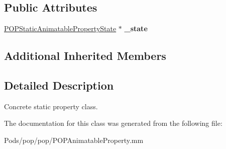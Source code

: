 \subsection*{Public Attributes}
\begin{DoxyCompactItemize}
\item 
\mbox{\label{interface_p_o_p_static_animatable_property_a6e920ae110f35be65164a6d5eef1ce87}} 
\mbox{\hyperlink{struct___p_o_p_static_animatable_property_state}{P\+O\+P\+Static\+Animatable\+Property\+State}} $\ast$ {\bfseries \+\_\+state}
\end{DoxyCompactItemize}
\subsection*{Additional Inherited Members}


\subsection{Detailed Description}
Concrete static property class. 

The documentation for this class was generated from the following file\+:\begin{DoxyCompactItemize}
\item 
Pods/pop/pop/P\+O\+P\+Animatable\+Property.\+mm\end{DoxyCompactItemize}
